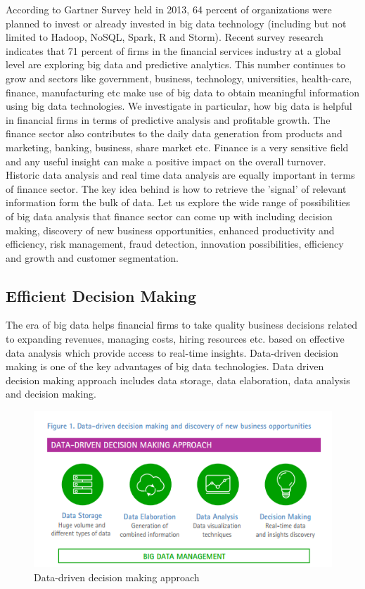 \documentclass[sigconf]{acmart}
\begin{document}
According to Gartner Survey held in 2013, 64 percent of organizations were planned to invest or already invested in big data technology (including but not limited to Hadoop, NoSQL, Spark, R and Storm)\cite{gartner-survey}. Recent survey research indicates that 71 percent of firms in the financial services industry at a global level are exploring big data and predictive analytics\cite{accenture-next-generation-financial}. This number continues to grow and sectors like government, business, technology, universities, health-care, finance, manufacturing etc make use of big data to obtain meaningful information using big data technologies\cite{wiki-bigdata}. We investigate in particular, how big data is helpful in financial firms in terms of predictive analysis and profitable growth. The finance sector also contributes to the daily data generation from products and marketing, banking, business, share market etc. Finance is a very sensitive field and any useful insight can make a positive impact on the overall turnover. Historic data analysis and real time data analysis are equally important in terms of finance sector. The key idea behind is how to retrieve the 'signal' of relevant information form the bulk of data. Let us explore the wide range of possibilities of big data analysis that finance sector can come up with including decision making, discovery of new business opportunities, enhanced productivity and efficiency, risk management, fraud detection, innovation possibilities, efficiency and growth and customer segmentation.

\subsection{Efficient Decision Making}

The era of big data helps financial firms to take quality business decisions related to expanding revenues, managing costs, hiring resources etc. based on effective data analysis which provide access to real-time insights.  Data-driven decision making is one of the key advantages of big data technologies. Data driven decision making approach includes data storage, data elaboration, data analysis and decision making\cite{accenture-next-generation-financial}.

\begin{figure}[htb]
  \centering
  \includegraphics[width=1.0\columnwidth]{images/Figure1.png}
  \caption{Data-driven decision making approach 
  \cite{accenture-next-generation-financial}}
  \label{fig:Figure1} 
\end{figure}
\end{document}
